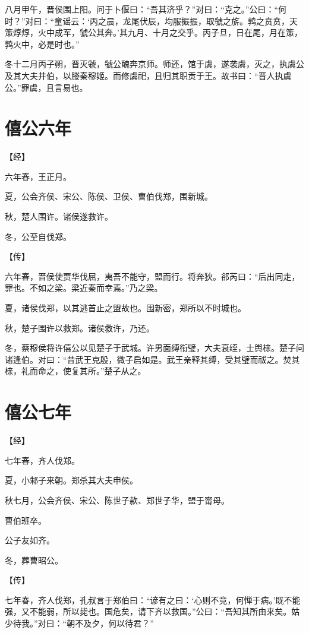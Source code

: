 \documentclass[a4paper,12pt,UTF8,twoside]{ctexbook}
\begin{document}
八月甲午，晋侯围上阳。问于卜偃曰：“吾其济乎？”对曰：“克之。”公曰：“何时？”对曰：“童谣云：‘丙之晨，龙尾伏辰，均服振振，取虢之旂。鹑之贲贲，天策焞焞，火中成军，虢公其奔。’其九月、十月之交乎。丙子旦，日在尾，月在策，鹑火中，必是时也。”

冬十二月丙子朔，晋灭虢，虢公醜奔京师。师还，馆于虞，遂袭虞，灭之，执虞公及其大夫井伯，以媵秦穆姬。而修虞祀，且归其职贡于王。故书曰：“晋人执虞公。”罪虞，且言易也。


\section{僖公六年}



【经】

六年春，王正月。

夏，公会齐侯、宋公、陈侯、卫侯、曹伯伐郑，围新城。

秋，楚人围许。诸侯遂救许。

冬，公至自伐郑。

【传】

六年春，晋侯使贾华伐屈，夷吾不能守，盟而行。将奔狄。郤芮曰：“后出同走，罪也。不如之梁。梁近秦而幸焉。”乃之梁。

夏，诸侯伐郑，以其逃首止之盟故也。围新密，郑所以不时城也。

秋，楚子围许以救郑。诸侯救许，乃还。

冬，蔡穆侯将许僖公以见楚子于武城。许男面缚衔璧，大夫衰绖，士舆榇。楚子问诸逢伯。对曰：“昔武王克殷，微子启如是。武王亲释其缚，受其璧而祓之。焚其榇，礼而命之，使复其所。”楚子从之。


\section{僖公七年}



【经】

七年春，齐人伐郑。

夏，小邾子来朝。郑杀其大夫申侯。

秋七月，公会齐侯、宋公、陈世子款、郑世子华，盟于甯母。

曹伯班卒。

公子友如齐。

冬，葬曹昭公。

【传】

七年春，齐人伐郑，孔叔言于郑伯曰：“谚有之曰：‘心则不竞，何惮于病。’既不能强，又不能弱，所以毙也。国危矣，请下齐以救国。”公曰：“吾知其所由来矣。姑少待我。”对曰：“朝不及夕，何以待君？”
\end{document}
